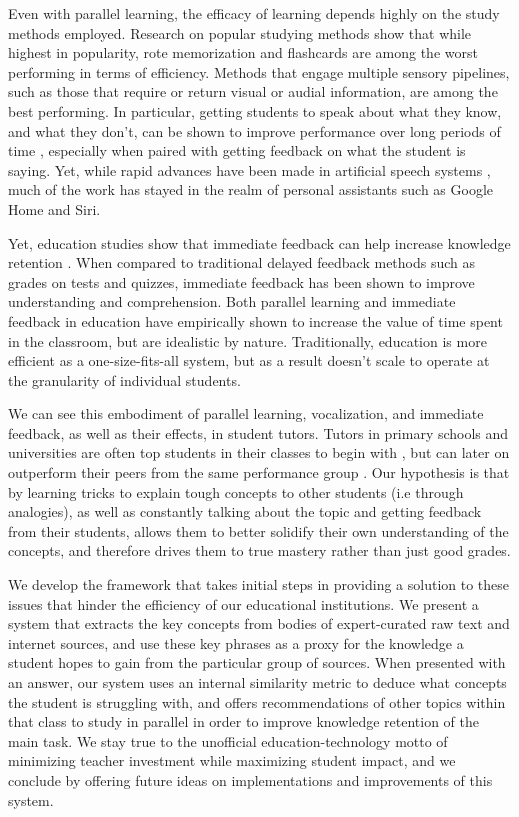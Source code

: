 \documentclass[11pt,a4paper]{article}
\begin{document}
Even with parallel learning, the efficacy of learning depends highly on the study methods employed. Research on popular studying methods \cite{TODO} show that while highest in popularity, rote memorization and flashcards are among the worst performing in terms of efficiency. Methods that engage multiple sensory pipelines, such as those that require or return visual or audial information, are among the best performing. In particular, getting students to speak about what they know, and what they don't, can be shown to improve performance over long periods of time \cite{TODO}, especially when paired with getting feedback on what the student is saying. Yet, while rapid advances have been made in artificial speech systems \cite{TODO: Both Transcribing and Understanding}, much of the work has stayed in the realm of personal assistants such as Google Home and Siri.  

Yet, education studies show that immediate feedback can help increase knowledge retention \cite{samuels_wu}. When compared to traditional delayed feedback methods such as grades on tests and quizzes, immediate feedback has been shown to improve understanding and comprehension. Both parallel learning and immediate feedback in education have empirically shown to increase the value of time spent in the classroom, but are idealistic by nature. Traditionally, education is more efficient as a one-size-fits-all system, but as a result doesn't scale to operate at the granularity of individual students. 

We can see this embodiment of parallel learning, vocalization, and immediate feedback, as well as their effects, in student tutors. Tutors in primary schools and universities are often top students in their classes to begin with \cite{TODO}, but can later on outperform their peers from the same performance group \cite{TODO}. Our hypothesis is that by learning tricks to explain tough concepts to other students (i.e through analogies), as well as constantly talking about the topic and getting feedback from their students, allows them to better solidify their own understanding of the concepts, and therefore drives them to true mastery rather than just good grades. 

We develop the framework that takes initial steps in providing a solution to these issues that hinder the efficiency of our educational institutions. We present a system that extracts the key concepts from bodies of expert-curated raw text and internet sources, and use these key phrases as a proxy for the knowledge a student hopes to gain from the particular group of sources. When presented with an answer, our system uses an internal similarity metric to deduce what concepts the student is struggling with, and offers recommendations of other topics within that class to study in parallel in order to improve knowledge retention of the main task. We stay true to the unofficial education-technology motto of minimizing teacher investment while maximizing student impact, and we conclude by offering future ideas on implementations and improvements of this system.
\end{document}
